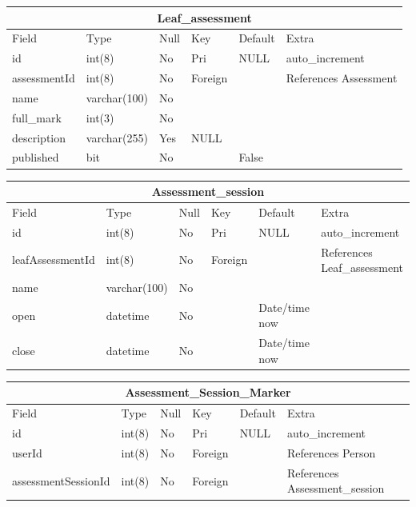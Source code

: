 \begin{table}[ht]
\begin{tabular}[c]{|l|l|l|l|l|l|}
  \hline
  \multicolumn{6}{|c|}{Leaf\_assessment} \\
  \hline 
  Field & Type & Null & Key & Default & Extra \\ [0.5ex] %
  \hline
  id & int(8) & No & Pri & NULL & auto\_increment \\
  assessmentId & int(8) & No & Foreign & & References Assessment \\
  name & varchar(100) & No & & & \\
  full\_mark & int(3) & No & & & \\
  description & varchar(255) & Yes & NULL & & \\
  published & bit & No & & False & \\
  \hline
\end{tabular}
\end{table} 

\begin{table}[ht]
\begin{tabular}[c]{|l|l|l|l|l|l|}
  \hline
  \multicolumn{6}{|c|}{Assessment\_session} \\
  \hline 
  Field & Type & Null & Key & Default & Extra \\ [0.5ex] %
  \hline
  id & int(8) & No & Pri & NULL & auto\_increment \\
  leafAssessmentId & int(8) & No & Foreign & & References Leaf\_assessment \\
  name & varchar(100) & No & & & \\
  open & datetime & No & & Date/time now & \\
  close & datetime & No & & Date/time now & \\
  \hline
\end{tabular}
\end{table} 

\begin{table}[ht]
\begin{tabular}[c]{|l|l|l|l|l|l|}
  \hline
  \multicolumn{6}{|c|}{Assessment\_Session\_Marker} \\
  \hline 
  Field & Type & Null & Key & Default & Extra \\ [0.5ex] %
  \hline
  id & int(8) & No & Pri & NULL & auto\_increment \\
  userId & int(8) & No & Foreign & & References Person\\
  assessmentSessionId & int(8) & No & Foreign & & References Assessment\_session \\
  \hline
\end{tabular}
\end{table} 

